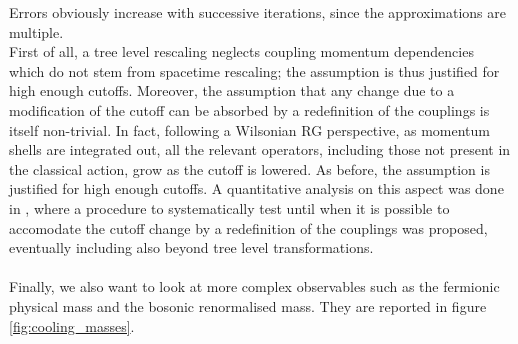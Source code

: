 Errors obviously increase with successive iterations, since the approximations are multiple. \\
First of all, a tree level rescaling neglects coupling momentum dependencies which do not stem from spacetime rescaling; the assumption is thus justified for high enough cutoffs. Moreover, the assumption that any change due to a modification of the cutoff can be absorbed by a redefinition of the couplings is itself non-trivial. In fact, following a Wilsonian RG perspective, as momentum shells are integrated out, 
all the relevant operators, including those not present in the classical action, grow as the cutoff is lowered. As before, the assumption is justified for high enough cutoffs.
A quantitative analysis on this aspect was done in \cite{Pawlowski2017CoolingNoise}, where a procedure to 
systematically test until when it is possible to accomodate the cutoff change by a redefinition of the couplings was proposed, eventually including also beyond tree level transformations. \\~\\
Finally, we also want to look at more complex observables such as the fermionic physical mass and the bosonic renormalised mass. They are reported in figure \ref{fig:cooling_masses}. 
